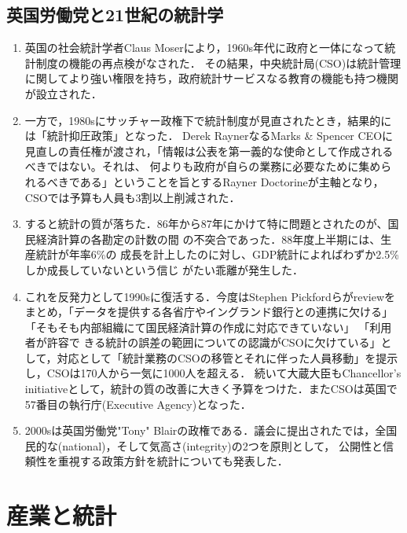 \documentclass[uplatex,dvipdfmx]{jsreport}
\begin{document}
\subsection{英国労働党と21世紀の統計学}

\begin{history}
    \begin{enumerate}
        \item 英国の社会統計学者Claus Moserにより，1960s年代に政府と一体になって統計制度の機能の再点検がなされた．
        その結果，中央統計局(CSO)は統計管理に関してより強い権限を持ち，政府統計サービスなる教育の機能も持つ機関が設立された．
        \item 一方で，1980sにサッチャー政権下で統計制度が見直されたとき，結果的には「統計抑圧政策」となった．
        Derek RaynerなるMarks \& Spencer CEOに見直しの責任権が渡され，「情報は公表を第一義的な使命として作成されるべきではない。それは、
        何よりも政府が自らの業務に必要なために集められるべきである」ということを旨とするRayner Doctorineが主軸となり，CSOでは予算も人員も3割以上削減された\cite{森博美-戦後イギリス統計機構の展開}．
        \item すると統計の質が落ちた．86年から87年にかけて特に問題とされたのが、国民経済計算の各勘定の計数の間
        の不突合であった．88年度上半期には、生産統計が年率6\%の
        成長を計上したのに対し、GDP統計によればわずか2.5\%しか成長していないという信じ
        がたい乖離が発生した．
        \item これを反発力として1990sに復活する．今度はStephen Pickfordらがreviewをまとめ，「データを提供する各省庁やイングランド銀行との連携に欠ける」「そもそも内部組織にて国民経済計算の作成に対応できていない」
        「利用者が許容で
        きる統計の誤差の範囲についての認識がCSOに欠けている」として，対応として「統計業務のCSOの移管とそれに伴った人員移動」を提示し，CSOは170人から一気に1000人を超える．
        続いて大蔵大臣もChancellor's initiativeとして，統計の質の改善に大きく予算をつけた．またCSOは英国で57番目の執行庁(Executive Agency)となった．
        \item 2000sは英国労働党"Tony" Blairの政権である．議会に提出された\cite{HMTreasury-Statistics_A_Matter_Of_Trust}では，全国民的な(national)，そして気高さ(integrity)の2つを原則として，
        公開性と信頼性を重視する政策方針を統計についても発表した．
    \end{enumerate}
\end{history}


\section{産業と統計}
\end{document}
